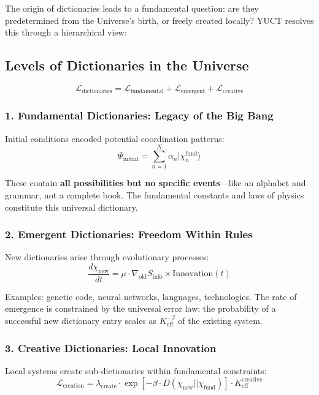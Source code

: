 \documentclass[12pt,a4paper]{article}
\newcommand{\eff}{\mathrm{eff}}
\newcommand{\Ke}{K_{\eff}}
\begin{document}
	The origin of dictionaries leads to a fundamental question: are they predetermined from the Universe's birth, or freely created locally? YUCT resolves this through a hierarchical view:
	
	\subsection{Levels of Dictionaries in the Universe}
	
	\[
	\mathcal{L}_{\text{dictionaries}} = \mathcal{L}_{\text{fundamental}} + \mathcal{L}_{\text{emergent}} + \mathcal{L}_{\text{creative}}
	\]
	
	\subsubsection{1. Fundamental Dictionaries: Legacy of the Big Bang}
	
	Initial conditions encoded potential coordination patterns:
	\[
	\Psi_{\text{initial}} = \sum_{n=1}^N \alpha_n |\chi_n^{\text{fund}}\rangle
	\]
	
	These contain \textbf{all possibilities but no specific events}—like an alphabet and grammar, not a complete book. The fundamental constants and laws of physics constitute this universal dictionary.
	
	\subsubsection{2. Emergent Dictionaries: Freedom Within Rules}
	
	New dictionaries arise through evolutionary processes:
	\[
	\frac{d\chi_{\text{new}}}{dt} = \mu \cdot \nabla_{\text{old}} S_{\text{info}} \times \text{Innovation}(t)
	\]
	
	Examples: genetic code, neural networks, languages, technologies. The rate of emergence is constrained by the universal error law: the probability of a successful new dictionary entry scales as $\Ke^{-\beta}$ of the existing system.
	
	\subsubsection{3. Creative Dictionaries: Local Innovation}
	
	Local systems create sub-dictionaries within fundamental constraints:
	\[
	\mathcal{L}_{\text{creation}} = \lambda_{\text{create}} \cdot \exp\left[-\beta \cdot D(\chi_{\text{new}} || \chi_{\text{fund}})\right] \cdot \Ke^{\text{creative}}
	\]
	
\end{document}
